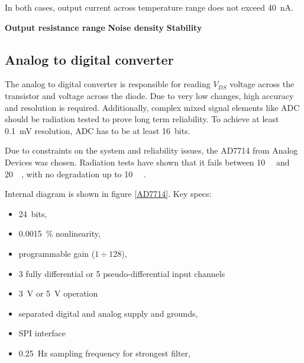         In both cases, output current across temperature range does not exceed \SI{40}{\nano\ampere}.

        \bigskip\textbf{Output resistance range}
        \bigskip\textbf{Noise density}
        \bigskip\textbf{Stability}

    \subsection{Analog to digital converter}
        The analog to digital converter is responsible for reading $V_{DS}$ voltage across the transistor and voltage across the diode. Due to very low changes, high accuracy and resolution is required. Additionally, complex mixed signal elements like ADC should be radiation tested to prove long term reliability. To achieve at least \SI{0.1}{\milli\volt} resolution, ADC has to be at least \SI{16}{bits}.

        Due to constraints on the system and reliability issues, the AD7714 from Analog Devices was chosen. Radiation tests have shown that it fails between \SI{10}{\kilo\rad} and \SI{20}{\kilo\rad}, with no degradation up to \SI{10}{\kilo\rad} \cite{ADC_radiation_tests}.

        Internal diagram is shown in figure \ref{AD7714}. Key specs:
        \begin{itemize}
            \item \SI{24}{bits},
            \item \SI{0.0015}{\percent} nonlinearity,
            \item programmable gain ($1 \div 128$),
            \item 3 fully differential or 5 pseudo-differential input channels
            \item \SI{3}{\volt} or \SI{5}{\volt} operation
            \item separated digital and analog supply and grounds,
            \item SPI interface
            \item \SI{0.25}{\hertz} sampling frequency for strongest filter,
        \end{itemize}

